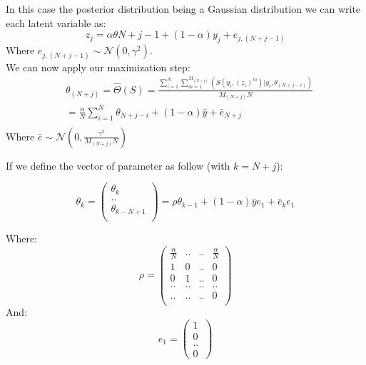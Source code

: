 \documentclass{article}
\theoremstyle{plain}
\theoremstyle{plain}
\theoremstyle{definition}
\begin{document}
In this case the posterior distribution being a Gaussian distribution we can write each latent variable as:
\begin{equation}
z_j = \alpha \theta{N+j-1} + (1-\alpha)y_j + e_{j,(N+j-1)}
\end{equation}
Where $e_{j,(N+j-1)} \sim \mathcal{N}(0, \gamma^2)$.\\

\noindent We can now apply our maximization step:
\begin{equation}
\begin{split}
& \theta_{(N+j)} = \hat{\Theta}(S) = \frac{\sum_{i=1}^{N}{\sum_{m=1}^{M_(N+j)}{(S(y_i,(z_i)^m)|y_i,\theta_{(N+j-i)})}}}{M_(N+j)N}\\
& = \frac{\alpha}{N} \sum_{i=1}^{N}{\theta_{N+j-i}} + (1-\alpha)\bar{y} + \bar{e}_{N+j}\\
\end{split}
\end{equation}
Where $\bar{e} \sim \mathcal{N}(0, \frac{\gamma^2}{M_(N+j)N})$

If we define the vector of parameter as follow (with $k=N+j$):

\begin{equation}
\theta_{k} = 
\left(
\begin{array}{c}
\theta_{k}\\
..\\
\theta_{k-N+1}\\
\end{array}
\right) = \rho \theta_{k-1} + (1-\alpha)\bar{y}e_1 + \bar{e}_k e_1
\end{equation}

Where:
\begin{equation}
\rho = \begin{pmatrix} 
\frac{\alpha}{N} & .. & .. & \frac{\alpha}{N} \\
1 & 0 & .. & 0\\
0 & 1 & .. & 0\\
.. & .. & .. & ..\\
.. & .. & .. & 0\\
\end{pmatrix}
\end{equation}
And:
\begin{equation}
e_1 = \begin{pmatrix} 
1\\
0\\
..\\
0\
\end{pmatrix} 
\end{equation}
\end{document}
